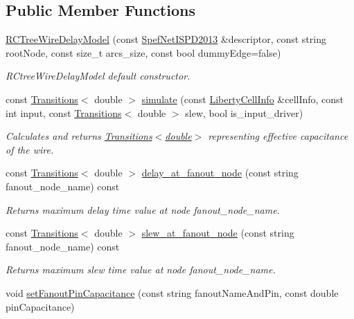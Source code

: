 \subsection*{Public Member Functions}
\begin{DoxyCompactItemize}
\item 
\hyperlink{classRCTreeWireDelayModel_a239d4784b2d39b6042fe39bee4838c6b}{R\-C\-Tree\-Wire\-Delay\-Model} (const \hyperlink{classSpefNetISPD2013}{Spef\-Net\-I\-S\-P\-D2013} \&descriptor, const string root\-Node, const size\-\_\-t arcs\-\_\-size, const bool dummy\-Edge=false)
\begin{DoxyCompactList}\small\item\em R\-Ctree\-Wire\-Delay\-Model default constructor. \end{DoxyCompactList}\item 
const \hyperlink{classTransitions}{Transitions}$<$ double $>$ \hyperlink{classRCTreeWireDelayModel_a06312bef3b98f0903335227fd7ea0f31}{simulate} (const \hyperlink{structLibertyCellInfo}{Liberty\-Cell\-Info} \&cell\-Info, const int input, const \hyperlink{classTransitions}{Transitions}$<$ double $>$ slew, bool is\-\_\-input\-\_\-driver)
\begin{DoxyCompactList}\small\item\em Calculates and returns \hyperlink{classTransitions}{Transitions$<$double$>$} representing effective capacitance of the wire. \end{DoxyCompactList}\item 
const \hyperlink{classTransitions}{Transitions}$<$ double $>$ \hyperlink{classRCTreeWireDelayModel_a7c769d54e8a520db1c5d4537d7e8b608}{delay\-\_\-at\-\_\-fanout\-\_\-node} (const string fanout\-\_\-node\-\_\-name) const 
\begin{DoxyCompactList}\small\item\em Returns maximum delay time value at node fanout\-\_\-node\-\_\-name. \end{DoxyCompactList}\item 
const \hyperlink{classTransitions}{Transitions}$<$ double $>$ \hyperlink{classRCTreeWireDelayModel_aea4c7315bdd3715ca0c67707b2c32a8c}{slew\-\_\-at\-\_\-fanout\-\_\-node} (const string fanout\-\_\-node\-\_\-name) const 
\begin{DoxyCompactList}\small\item\em Returns maximum slew time value at node fanout\-\_\-node\-\_\-name. \end{DoxyCompactList}\item 
void \hyperlink{classRCTreeWireDelayModel_a106079b64e0e6b84327fc5a9b4c29a6a}{set\-Fanout\-Pin\-Capacitance} (const string fanout\-Name\-And\-Pin, const double pin\-Capacitance)

\end{DoxyCompactItemize}
